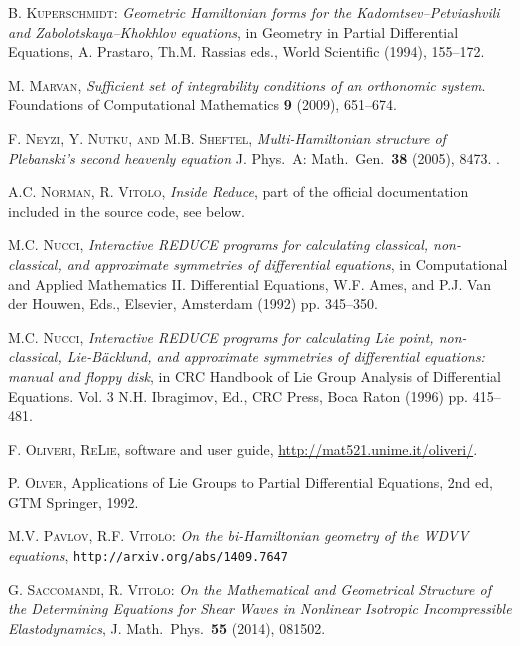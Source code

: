 \begin{thebibliography}{999}
 \textsc{B. Kuperschmidt}:
  \emph{Geometric Hamiltonian forms for the
    Kadomtsev--Petviashvili and Zabolotskaya--Khokhlov equations}, in Geometry
  in Partial Differential Equations, A. Prastaro, Th.M. Rassias eds., World
  Scientific (1994), 155--172.

 \textsc{M. Marvan}, \emph{Sufficient set of integrability
    conditions of an orthonomic system}.  Foundations of Computational
    Mathematics \textbf{9} (2009), 651--674.

 \textsc{F. Neyzi, Y. Nutku, and
      M.B. Sheftel}, \emph{Multi-Hamiltonian structure of Plebanski's second
      heavenly equation} J. Phys.\ A: Math.\ Gen.\ \textbf{38} (2005),
    8473. .

 \textsc{A.C. Norman, R. Vitolo}, \emph{Inside Reduce}, part
    of the official \REDUCE documentation included in the source code, see
    below.

 \textsc{M.C. Nucci}, \emph{Interactive REDUCE
      programs for calculating classical, non-classical, and approximate
      symmetries of differential equations}, in Computational and Applied
    Mathematics II. Differential Equations, W.F. Ames, and P.J. Van der Houwen,
    Eds., Elsevier, Amsterdam (1992) pp. 345--350.

 \textsc{M.C. Nucci}, \emph{Interactive REDUCE programs for
    calculating Lie point, non-classical, Lie-B\"{a}cklund, and approximate
    symmetries of differential equations: manual and floppy disk}, in
CRC Handbook of Lie Group Analysis of Differential Equations. Vol. 3
N.H. Ibragimov, Ed., CRC Press, Boca Raton (1996) pp. 415--481.

 \textsc{F. Oliveri}, \textsc{ReLie}, \REDUCE software and user
  guide, \url{http://mat521.unime.it/oliveri/}.

 \textsc{P. Olver}, Applications of Lie Groups to Partial
  Differential Equations, 2nd ed, GTM Springer, 1992.

 \textsc{M.V. Pavlov, R.F. Vitolo}: \emph{On the bi-Hamiltonian
    geometry of the WDVV equations}, \texttt{http://arxiv.org/abs/1409.7647}

 \textsc{G. Saccomandi, R. Vitolo}: \emph{On the Mathematical
    and Geometrical Structure of the Determining Equations for Shear Waves in
    Nonlinear Isotropic Incompressible Elastodynamics}, J. Math.\ Phys.\
  \textbf{55} (2014), 081502.


\end{thebibliography}
